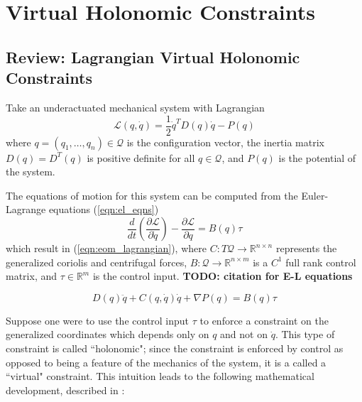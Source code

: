 
\section{Virtual Holonomic Constraints}\label{sec:vhcs}

\subsection{Review: Lagrangian Virtual Holonomic Constraints}
Take an underactuated mechanical system with Lagrangian
\begin{equation}\label{eqn:lagrangian}
\mathcal{L}(q,\dot{q}) = \frac{1}{2} \dot{q}^T D(q) \dot{q} - P(q)
\end{equation}
where \(q = (q_1,\ldots,q_n) \in \mathcal{Q}\) is the configuration vector, 
the inertia matrix \(D(q) = D^T(q)\) is positive definite for all 
\(q \in \mathcal{Q}\), and \(P(q)\) is the potential of the system.


The equations of motion for this system can be computed from 
the Euler-Lagrange equations (\ref{eqn:el_eqns})
\begin{equation}\label{eqn:el_eqns}
   \frac{d}{dt} \left( \frac{\partial \mathcal{L}}{\partial \dot{q}}\right) -
   \frac{\partial \mathcal{L}}{\partial q} = B(q)\tau
\end{equation}
which result in (\ref{eqn:eom_lagrangian}), where
\(C : T\mathcal{Q} \rightarrow \mathbb{R}^{n \times n}\) represents the
generalized coriolis and centrifugal forces,
\(B : \mathcal{Q} \rightarrow \mathbb{R}^{n \times m}\) is a 
\(C^1\) full rank control matrix, and \(\tau \in \mathbb{R}^{m}\) is the control 
input. \textbf{TODO: citation for E-L equations}

\begin{equation}\label{eqn:eom_lagrangian}
D(q)\ddot{q} + C(q,\dot{q})\dot{q} + \nabla P(q) = B(q)\tau
\end{equation}

Suppose one were to use the control input \(\tau\) to enforce a
constraint on the generalized coordinates which depends only on \(q\) and not on
\(\dot{q}\). This type of constraint is called ``holonomic"; since the 
constraint is enforced by control as opposed to being a feature of the mechanics
of the system, it is a called a ``virtual" constraint. 
This intuition leads to the following mathematical development, described in 
\cite{vhcs_for_el_systems}:

